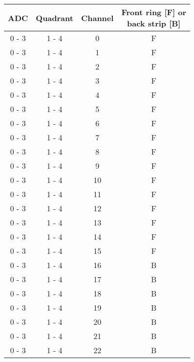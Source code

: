 \begin{tabular}{cccc}
\hline
ADC    & Quadrant & Channel &  \shortstack{Front ring [F] or \\ back strip [B]} \\
\hline
0 - 3  &  1 - 4   &  0      &  F                    		   					\\
0 - 3  &  1 - 4   &  1      &  F                    		   					\\
0 - 3  &  1 - 4   &  2      &  F                    		   					\\
0 - 3  &  1 - 4   &  3      &  F                    		   					\\
0 - 3  &  1 - 4   &  4      &  F                    		   					\\
0 - 3  &  1 - 4   &  5      &  F                    		   					\\
0 - 3  &  1 - 4   &  6      &  F                    		   					\\
0 - 3  &  1 - 4   &  7      &  F                    		   					\\
0 - 3  &  1 - 4   &  8      &  F                    		   					\\
0 - 3  &  1 - 4   &  9      &  F                    		   					\\
0 - 3  &  1 - 4   &  10     &  F                    		   					\\
0 - 3  &  1 - 4   &  11     &  F                    		   					\\
0 - 3  &  1 - 4   &  12     &  F                    		   					\\
0 - 3  &  1 - 4   &  13     &  F                    		   					\\
0 - 3  &  1 - 4   &  14     &  F                    		   					\\
0 - 3  &  1 - 4   &  15     &  F                    		   					\\
0 - 3  &  1 - 4   &  16     &  B                    		   					\\
0 - 3  &  1 - 4   &  17     &  B                    		   					\\
0 - 3  &  1 - 4   &  18     &  B                    		   					\\
0 - 3  &  1 - 4   &  19     &  B                    		   					\\
0 - 3  &  1 - 4   &  20     &  B                    		   					\\
0 - 3  &  1 - 4   &  21     &  B                    		   					\\
0 - 3  &  1 - 4   &  22     &  B                    		   					\\

\end{tabular}
